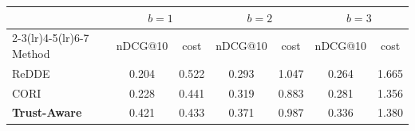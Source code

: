\begin{tabular}{l cc cc cc}
\toprule
& \multicolumn{2}{c}{$b{=}1$} & \multicolumn{2}{c}{$b{=}2$} & \multicolumn{2}{c}{$b{=}3$}\\
\cmidrule(lr){2-3}\cmidrule(lr){4-5}\cmidrule(lr){6-7}
Method & nDCG@10 & cost & nDCG@10 & cost & nDCG@10 & cost \\
\midrule
ReDDE & 0.204 & 0.522 & 0.293 & 1.047 & 0.264 & 1.665 \\
CORI & 0.228 & 0.441 & 0.319 & 0.883 & 0.281 & 1.356 \\
\textbf{Trust-Aware} & 0.421 & 0.433 & 0.371 & 0.987 & 0.336 & 1.380 \\
\bottomrule
\end{tabular}
